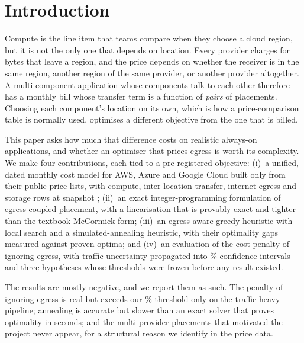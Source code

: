 \documentclass[conference]{IEEEtran}
\newcommand{\pct}[1]{\N{#1}\%}
\begin{document}
\section{Introduction}
Compute is the line item that teams compare when they choose a cloud region, but it is not the
only one that depends on location. Every provider charges for bytes that leave a region, and the
price depends on whether the receiver is in the same region, another region of the same provider,
or another provider altogether. A multi-component application whose components talk to each other
therefore has a monthly bill whose transfer term is a function of \emph{pairs} of placements. Choosing
each component's location on its own, which is how a price-comparison table is normally used,
optimises a different objective from the one that is billed.

This paper asks how much that difference costs on realistic always-on applications, and whether
an optimiser that prices egress is worth its complexity. We make four contributions, each tied to
a pre-registered objective:
(i)~a unified, dated monthly cost model for AWS, Azure and Google Cloud built only from their public
price lists, with  compute,  inter-location transfer,
 internet-egress and  storage rows at snapshot ;
(ii)~an exact integer-programming formulation of egress-coupled placement, with a linearisation
that is provably exact and tighter than the textbook McCormick form;
(iii)~an egress-aware greedy heuristic with local search and a simulated-annealing heuristic, with
their optimality gaps measured against proven optima; and
(iv)~an evaluation of the cost penalty of ignoring egress, with traffic uncertainty propagated into
\% confidence intervals and three hypotheses whose thresholds were frozen before any result existed.

The results are mostly negative, and we report them as such. The penalty of ignoring egress is real
but exceeds our \pct{h1.thr} threshold only on the traffic-heavy pipeline; annealing is accurate but
slower than an exact solver that proves optimality in seconds; and the multi-provider placements that
motivated the project never appear, for a structural reason we identify in the price data.
\end{document}
